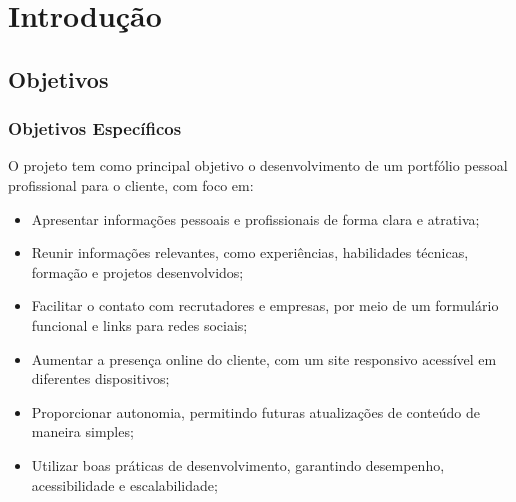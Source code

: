 \chapter{Introdução}
\label{chap:intro}






% 
\section{Objetivos}

\label{sec:obj}

\label{sec:obj}

\subsection{Objetivos Específicos}
\label{ssec:objesp}

O projeto tem como principal objetivo o desenvolvimento de um portfólio pessoal profissional para o cliente, com foco em:
\begin{itemize}
      \item Apresentar informações pessoais e profissionais de forma clara e atrativa;
      \item Reunir informações relevantes, como experiências, habilidades técnicas, formação e projetos desenvolvidos;
      \item Facilitar o contato com recrutadores e empresas, por meio de um formulário funcional e links para redes sociais;
      \item Aumentar a presença online do cliente, com um site responsivo acessível em diferentes dispositivos;
      \item Proporcionar autonomia, permitindo futuras atualizações de conteúdo de maneira simples;
      \item Utilizar boas práticas de desenvolvimento, garantindo desempenho, acessibilidade e escalabilidade;
\end{itemize}

